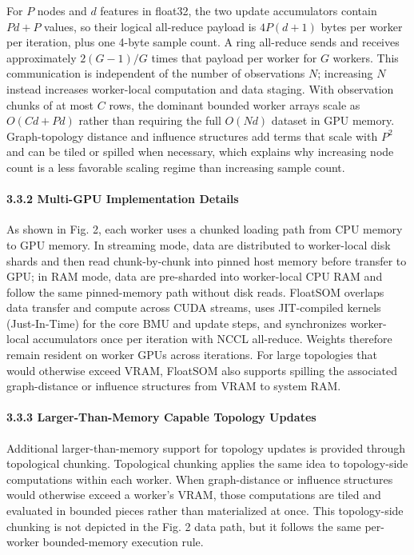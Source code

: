 \documentclass[
]{article}
\providecommand{\DIFadd}[1]{{\protect\color{blue} #1}} %
\providecommand{\DIFaddbegin}{} %
\providecommand{\DIFaddend}{} %
\begin{document}
\DIFaddbegin \DIFadd{For \(P\) nodes and \(d\) features in float32, the two update
accumulators contain \(P d+P\) values, so their logical all-reduce
payload is \(4P(d+1)\) bytes per worker per iteration, plus one 4-byte
sample count. A ring all-reduce sends and receives approximately
\(2(G-1)/G\) times that payload per worker for \(G\) workers. This
communication is independent of the number of observations \(N\);
increasing \(N\) instead increases worker-local computation and data
staging. With observation chunks of at most \(C\) rows, the dominant
bounded worker arrays scale as \(O(Cd+Pd)\) rather than requiring the
full \(O(Nd)\) dataset in GPU memory. Graph-topology distance and
influence structures add terms that scale with \(P^2\) and can be tiled
or spilled when necessary, which explains why increasing node count is a
less favorable scaling regime than increasing sample count.
}

\DIFaddend \paragraph{3.3.2 Multi-GPU Implementation
Details}\label{multi-gpu-implementation-details}

As shown in Fig. 2, each worker uses a chunked loading path from CPU
memory to GPU memory. In streaming mode, data are distributed to
worker-local disk shards and then read chunk-by-chunk into pinned host
memory before transfer to GPU; in RAM mode, data are pre-sharded into
worker-local CPU RAM and follow the same pinned-memory path without disk
reads. FloatSOM overlaps data transfer and compute across CUDA streams,
uses JIT-compiled kernels (Just-In-Time) for the core BMU and update
steps, and synchronizes worker-local accumulators once per iteration
with NCCL all-reduce. Weights therefore remain resident on worker GPUs
across iterations. For large topologies that would otherwise exceed
VRAM, FloatSOM also supports spilling the associated graph-distance or
influence structures from VRAM to system RAM.

\paragraph{3.3.3 Larger-Than-Memory Capable Topology
Updates}\label{larger-than-memory-capable-topology-updates}

Additional larger-than-memory support for topology updates is provided
through topological chunking. Topological chunking applies the same idea
to topology-side computations within each worker. When graph-distance or
influence structures would otherwise exceed a worker's VRAM, those
computations are tiled and evaluated in bounded pieces rather than
materialized at once. This topology-side chunking is not depicted in the
Fig. 2 data path, but it follows the same per-worker bounded-memory
execution rule.
\end{document}
